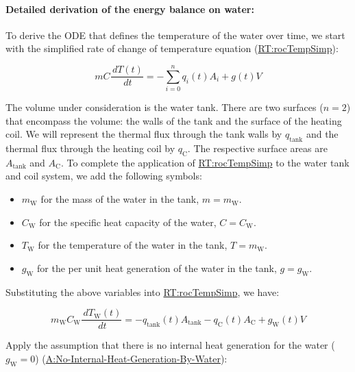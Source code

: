 \documentclass[12pt]{article}
\begin{document}

\paragraph{Detailed derivation of the energy balance on water:}
\label{FT:eBalanceOnWtrDeriv}

To derive the ODE that defines the temperature of the water over time, we start
with the simplified rate of change of temperature equation
(\hyperref[RT:rocTempSimp]{RT:rocTempSimp}):

\begin{displaymath}
m C \frac{\,dT(t)}{\,dt} = -\sum_{i=0}^n {q_i(t)} {A_i} + g(t) V
\end{displaymath}

The volume under consideration is the water tank.  There are two surfaces
($n=2$) that encompass the volume: the walls of the tank and the surface of the
heating coil.  We will represent the thermal flux through the tank walls by
$q_\text{tank}$ and the thermal flux through the heating coil by $q_\text{C}$.
The respective surface areas are $A_\text{tank}$ and $A_\text{C}$. To complete
the application of \hyperref[RT:rocTempSimp]{RT:rocTempSimp} to the water tank
and coil system, we add the following symbols: 

\begin{itemize}
\item $m_\text{W}$ for the mass of the water in the tank, $m = m_\text{W}$.
\item $C_\text{W}$ for the specific heat capacity of the water, $C =
C_\text{W}$.
\item $T_\text{W}$ for the temperature of the water in the tank, $T =
m_\text{W}$.
\item $g_\text{W}$ for the per unit heat generation of the water in the tank, $g
= g_\text{W}$.
\end{itemize}

Substituting the above variables into \hyperref[RT:rocTempSimp]{RT:rocTempSimp}, we have:

\begin{displaymath}
m_\text{W} C_\text{W} \frac{\,dT_\text{W}(t)}{\,dt} = -{q_\text{tank}(t)} {A_\text{tank}} -{q_\text{C}(t)} {A_\text{C}} + g_\text{W}(t) V
\end{displaymath}

Apply the assumption that there is no internal heat generation for the water
($g_\text{W} = 0$) (\hyperref[assumpNIHGBW]{A:No-Internal-Heat-Generation-By-Water}):
\end{document}
